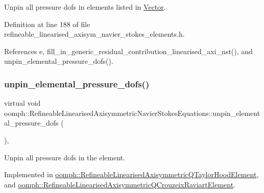 Unpin all pressure dofs in elements listed in \hyperlink{classoomph_1_1Vector}{Vector}. 



Definition at line 188 of file refineable\+\_\+linearised\+\_\+axisym\+\_\+navier\+\_\+stokes\+\_\+elements.\+h.



References e, fill\+\_\+in\+\_\+generic\+\_\+residual\+\_\+contribution\+\_\+linearised\+\_\+axi\+\_\+nst(), and unpin\+\_\+elemental\+\_\+pressure\+\_\+dofs().

\mbox{\label{classoomph_1_1RefineableLinearisedAxisymmetricNavierStokesEquations_a7a0d635c46d7faabe63c432b3435455d}} 
\subsubsection{\texorpdfstring{unpin\+\_\+elemental\+\_\+pressure\+\_\+dofs()}{unpin\_elemental\_pressure\_dofs()}}
{\footnotesize\ttfamily virtual void oomph\+::\+Refineable\+Linearised\+Axisymmetric\+Navier\+Stokes\+Equations\+::unpin\+\_\+elemental\+\_\+pressure\+\_\+dofs (\begin{DoxyParamCaption}{ }\end{DoxyParamCaption})\hspace{0.3cm}{\ttfamily [protected]}, {}}



Unpin all pressure dofs in the element. 



Implemented in \hyperlink{classoomph_1_1RefineableLinearisedAxisymmetricQTaylorHoodElement_a89fd645f3c0f8349767947573c48252c}{oomph\+::\+Refineable\+Linearised\+Axisymmetric\+Q\+Taylor\+Hood\+Element}, and \hyperlink{classoomph_1_1RefineableLinearisedAxisymmetricQCrouzeixRaviartElement_ab531f0a504465f6242f931dc5c01f008}{oomph\+::\+Refineable\+Linearised\+Axisymmetric\+Q\+Crouzeix\+Raviart\+Element}.



